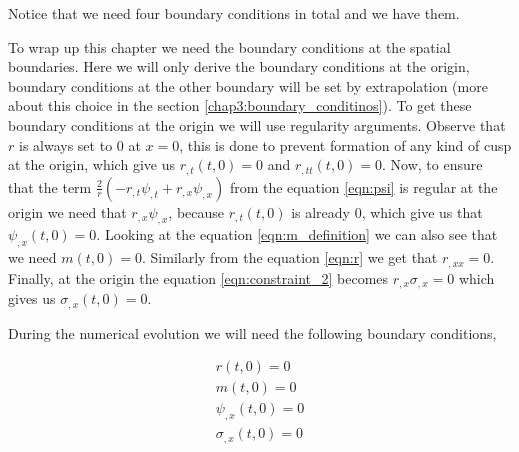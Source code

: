 Notice that we need four boundary conditions in total and we have them.

To wrap up this chapter we need the boundary conditions at the spatial boundaries. Here we will only derive the boundary conditions at the origin, boundary conditions at the other boundary will be set by extrapolation (more about this choice in the section \ref{chap3:boundary_conditinos}). To get these boundary conditions at the origin we will use regularity arguments.
Observe that $r$ is always set to $0$ at $x=0$, this is done to prevent formation of any kind of cusp at the origin, which give us $r_{,t}(t,0) = 0$ and $r_{,tt}(t,0)=0$.
Now, to ensure that the term $\frac{2}{r}\left(-r_{, t} \psi_{, t}+r_{, x} \psi_{, x}\right)$ from the equation \ref{eqn:psi} is regular at the origin we need that $r_{, x} \psi_{, x}$, because $r_{,t}(t,0)$ is already $0$, which give us that $\psi_{,x}(t,0) = 0$. Looking at the equation \ref{eqn:m_definition} we can also see that we need $m(t,0) = 0 $. Similarly from the equation \ref{eqn:r} we get that $r_{,xx}=0$. Finally, at the origin the equation \ref{eqn:constraint_2} becomes $r_{,x} \sigma_{,x} = 0$ which gives us $\sigma_{,x}(t,0) = 0$.


During the numerical evolution we will need the following boundary conditions,

\begin{eqnarray}
    r(t,0) = 0 \\
    m(t,0) =0 \\
    \psi_{,x}(t,0) = 0\\
    \sigma_{,x}(t,0) = 0
\end{eqnarray}
